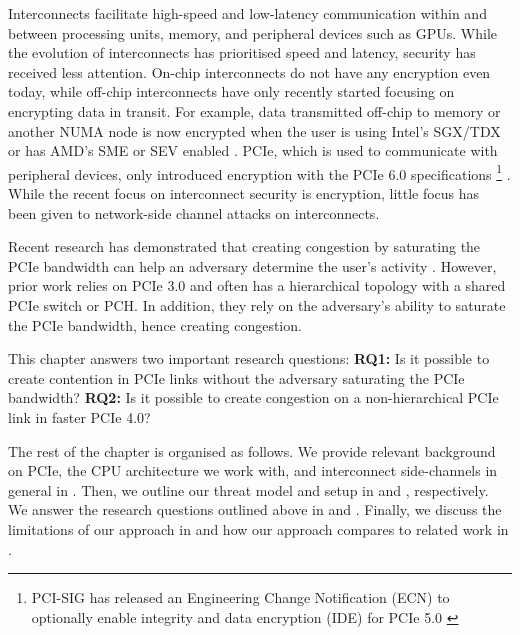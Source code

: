
Interconnects facilitate high-speed and low-latency communication within and between processing units, memory, and peripheral devices such as GPUs.
While the evolution of interconnects has prioritised speed and latency, security has received less attention.
On-chip interconnects do not have any encryption even today, while off-chip interconnects have only recently started focusing on encrypting data in transit.
For example, data transmitted off-chip to memory or another NUMA node is now encrypted when the user is using Intel's SGX/TDX or has AMD's SME or SEV enabled \cite{intel_upi_encryption, amd_gen_5_arch}.
PCIe, which is used to communicate with peripheral devices, only introduced encryption with the PCIe 6.0 specifications 
\footnote{PCI-SIG has released an Engineering Change Notification (ECN) to optionally enable integrity and data encryption (IDE) for PCIe 5.0 \cite{pcie_ide_v5_ecn}}
\cite{pcie_ide_v6}.
While the recent focus on interconnect security is encryption, little focus has been given to network-side channel attacks on interconnects.

Recent research has demonstrated that creating congestion by saturating the PCIe bandwidth can help an adversary determine the user's activity \cite{tan2021invisible, giechaskiel2022cross, side2022lockeddown}.
However, prior work \cite{tan2021invisible, giechaskiel2022cross, side2022lockeddown} relies on PCIe 3.0 and often has a hierarchical topology with a shared PCIe switch or PCH.
In addition, they rely on the adversary's ability to saturate the PCIe bandwidth, hence creating congestion.

This chapter answers two important research questions:
\textbf{RQ1:} Is it possible to create contention in PCIe links without the adversary saturating the PCIe bandwidth?
\textbf{RQ2:} Is it possible to create congestion on a non-hierarchical PCIe link in faster PCIe 4.0?

The rest of the chapter is organised as follows.
We provide relevant background on PCIe, the CPU architecture we work with, and interconnect side-channels in general in . 
Then, we outline our threat model and setup in  and , respectively.
We answer the research questions outlined above in  and .
Finally, we discuss the limitations of our approach in  and how our approach compares to related work in .

